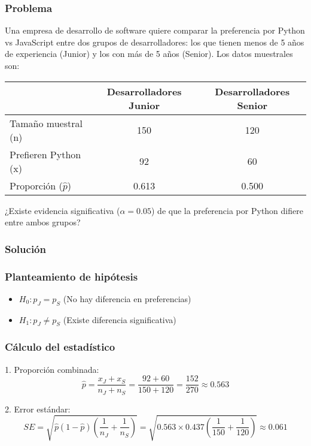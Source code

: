 \subsubsection*{Problema}
Una empresa de desarrollo de software quiere comparar la preferencia por Python vs JavaScript entre dos grupos de desarrolladores: los que tienen menos de 5 años de experiencia (Junior) y los con más de 5 años (Senior). Los datos muestrales son:

\begin{center}
\begin{tabular}{lcc}
\toprule
& Desarrolladores Junior & Desarrolladores Senior \\
\midrule
Tamaño muestral (n) & 150 & 120 \\
Prefieren Python (x) & 92 & 60 \\
Proporción ($\hat{p}$) & 0.613 & 0.500 \\
\bottomrule
\end{tabular}
\end{center}

¿Existe evidencia significativa ($\alpha = 0.05$) de que la preferencia por Python difiere entre ambos grupos?

\subsubsection*{Solución}

\subsubsection*{Planteamiento de hipótesis}
\begin{itemize}
\item $H_0: p_J = p_S$ (No hay diferencia en preferencias)
\item $H_1: p_J \neq p_S$ (Existe diferencia significativa)
\end{itemize}

\subsubsection*{Cálculo del estadístico}
1. Proporción combinada:
\[
\hat{p} = \frac{x_J + x_S}{n_J + n_S} = \frac{92 + 60}{150 + 120} = \frac{152}{270} \approx 0.563
\]

2. Error estándar:
\[
SE = \sqrt{\hat{p}(1-\hat{p})\left(\frac{1}{n_J} + \frac{1}{n_S}\right)} = \sqrt{0.563 \times 0.437 \left(\frac{1}{150} + \frac{1}{120}\right)} \approx 0.061
\]

